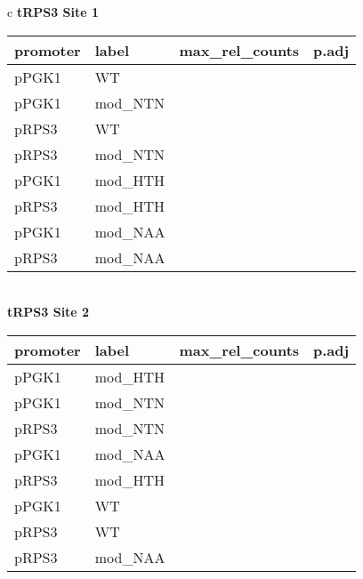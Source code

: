 \documentclass[../main.tex]{subfiles}
\begin{document}
\begin{table}[ph!]
\def\arraystretch{1.25}
\centering 
\begingroup\setlength{\tabcolsep}{5pt}\fontsize{9}{9}\selectfont\begin{tabular}{ c } \textbf{tRPS3 Site 1} \\
\begin{tabularx}{0.8\textwidth} { 
  | >{\centering\arraybackslash}X 
  | >{\centering\arraybackslash}X  
  | >{\centering\arraybackslash}X
  | >{\centering\arraybackslash}X | }
\hline
\textbf{promoter} & \textbf{label} & \textbf{max\_rel\_counts} & \textbf{p.adj}\\
\hline
pPGK1 & WT & 0.0013042 & 0.016\\
\hline
pPGK1 & mod\_NTN & 0.1052831 & 0.016\\
\hline
pRPS3 & WT & 0.0013267 & 0.016\\
\hline
pRPS3 & mod\_NTN & 0.0819971 & 0.035\\
\hline
pPGK1 & mod\_HTH & 0.1007454 & 0.420\\
\hline
pRPS3 & mod\_HTH & 0.1161378 & 0.530\\
\hline
pPGK1 & mod\_NAA & 0.1248866 & 0.640\\
\hline
pRPS3 & mod\_NAA & 0.1769533 & 0.970\\
\hline
\end{tabularx} \\
\textbf{tRPS3 Site 2} \\
\begin{tabularx}{0.8\textwidth} { 
  | >{\centering\arraybackslash}X 
  | >{\centering\arraybackslash}X  
  | >{\centering\arraybackslash}X
  | >{\centering\arraybackslash}X | }
\hline
\textbf{promoter} & \textbf{label} & \textbf{max\_rel\_counts} & \textbf{p.adj}\\
\hline
pPGK1 & mod\_HTH & 0.3172375 & 0.016\\
\hline
pPGK1 & mod\_NTN & 0.3945115 & 0.016\\
\hline
pRPS3 & mod\_NTN & 0.3940147 & 0.016\\
\hline
pPGK1 & mod\_NAA & 0.2223265 & 0.420\\
\hline
pRPS3 & mod\_HTH & 0.3281569 & 0.530\\
\hline
pPGK1 & WT & 0.1708060 & 0.640\\
\hline
pRPS3 & WT & 0.1697265 & 0.970\\
\hline
pRPS3 & mod\_NAA & 0.2062429 & 0.970\\
\hline
\end{tabularx} \\

\end{tabular}
\end{table}
\end{document}
